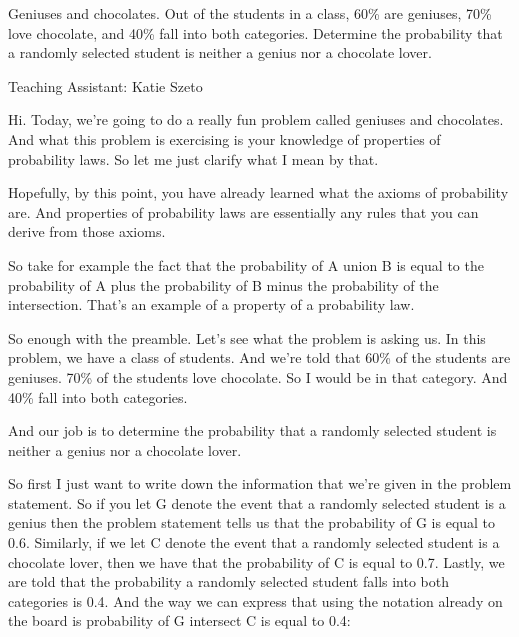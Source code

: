 \documentclass[pdftex, brazil, 12pt, twoside]{article}
\begin{document}
Geniuses and chocolates. Out of the students in a class, 60\% are geniuses, 70\%
love chocolate, and 40\% fall into both categories. Determine the probability that
a randomly selected student is neither a genius nor a chocolate lover.

Teaching Assistant: Katie Szeto

Hi.
Today, we're going to do a really fun problem called
geniuses and chocolates.
And what this problem is exercising is your knowledge
of properties of probability laws.
So let me just clarify what I mean by that.

Hopefully, by this point, you have already learned what the
axioms of probability are.
And properties of probability laws are essentially any rules
that you can derive from those axioms.

So take for example the fact that the probability of A
union B is equal to the probability of A plus the
probability of B minus the probability of the
intersection.
That's an example of a property of a probability law.

So enough with the preamble.
Let's see what the problem is asking us.
In this problem, we have a class of students.
And we're told that 60\% of the students are geniuses.
70\% of the students love chocolate.
So I would be in that category.
And 40\% fall into both categories.

And our job is to determine the probability that a
randomly selected student is neither a genius nor a
chocolate lover.

So first I just want to write down the information that
we're given in the problem statement.
So if you let G denote the event that a randomly selected
student is a genius then the problem statement tells us
that the probability of G is equal to 0.6.
Similarly, if we let C denote the event that a randomly
selected student is a chocolate lover, then we have
that the probability of C is equal to 0.7.
Lastly, we are told that the probability a randomly
selected student falls into both categories is 0.4.
And the way we can express that using the notation
already on the board is probability of G intersect C
is equal to 0.4:

\begin{figure}[H]
  \begin{center}
  \end{center}
\end{figure}
\end{document}
